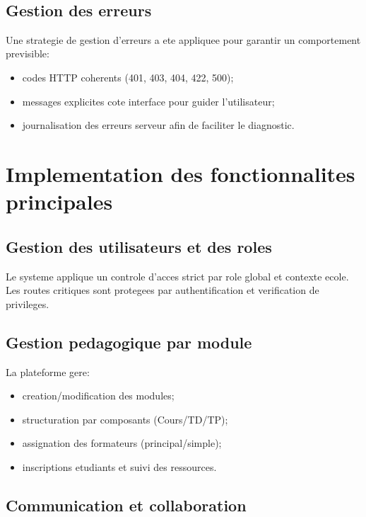 ﻿﻿\documentclass[12pt,a4paper,oneside]{report}
\begin{document}
\subsection{Gestion des erreurs}

Une strategie de gestion d'erreurs a ete appliquee pour garantir un comportement previsible:
\begin{itemize}
  \item codes HTTP coherents (401, 403, 404, 422, 500);
  \item messages explicites cote interface pour guider l'utilisateur;
  \item journalisation des erreurs serveur afin de faciliter le diagnostic.
\end{itemize}

\section{Implementation des fonctionnalites principales}

\subsection{Gestion des utilisateurs et des roles}

Le systeme applique un controle d'acces strict par role global et contexte ecole. Les routes critiques sont protegees par authentification et verification de privileges.

\subsection{Gestion pedagogique par module}

La plateforme gere:
\begin{itemize}
  \item creation/modification des modules;
  \item structuration par composants (Cours/TD/TP);
  \item assignation des formateurs (principal/simple);
  \item inscriptions etudiants et suivi des ressources.
\end{itemize}

\subsection{Communication et collaboration}
\end{document}
